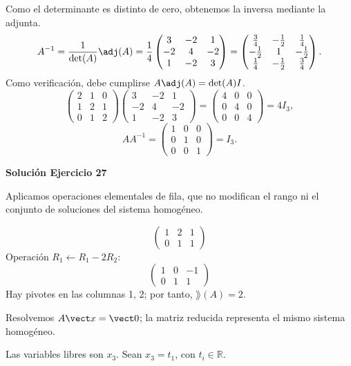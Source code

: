 Como el determinante es distinto de cero, obtenemos la inversa mediante la adjunta.
\[
A^{-1}=\frac1{\det(A)}\adj(A)=\frac1{4}\begin{pmatrix}3&-2&1\\-2&4&-2\\1&-2&3\end{pmatrix}=\begin{pmatrix}\frac{3}{4}&- \frac{1}{2}&\frac{1}{4}\\- \frac{1}{2}&1&- \frac{1}{2}\\\frac{1}{4}&- \frac{1}{2}&\frac{3}{4}\end{pmatrix}.
\]
Como verificación, debe cumplirse $A\adj(A)=\det(A)I$.
\[
\begin{pmatrix}2&1&0\\1&2&1\\0&1&2\end{pmatrix}\begin{pmatrix}3&-2&1\\-2&4&-2\\1&-2&3\end{pmatrix}=\begin{pmatrix}4&0&0\\0&4&0\\0&0&4\end{pmatrix}=4I_{3},
\]
\[
AA^{-1}=\begin{pmatrix}1&0&0\\0&1&0\\0&0&1\end{pmatrix}=I_{3}.
\]

\par\bigskip\noindent\textbf{Solución Ejercicio 27}\par\nobreak
Aplicamos operaciones elementales de fila, que no modifican el rango ni el conjunto de soluciones del sistema homogéneo.

\[
\begin{pmatrix}1&2&1\\0&1&1\end{pmatrix}
\]
Operación $R_{1}\leftarrow R_{1}-2R_{2}$:
\[
\begin{pmatrix}1&0&-1\\0&1&1\end{pmatrix}
\]
Hay pivotes en las columnas 1, 2; por tanto, $\boxed{\rang(A)=2}$.

Resolvemos $A\vect x=\vect0$; la matriz reducida representa el mismo sistema homogéneo.

Las variables libres son $x_{3}$. Sean $x_{3}=t_{1}$, con $t_i\in\mathbb R$.

